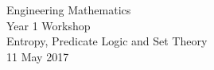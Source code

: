 Engineering Mathematics\\
Year 1 Workshop\\
Entropy, Predicate Logic and Set Theory\\
11 May 2017\\
